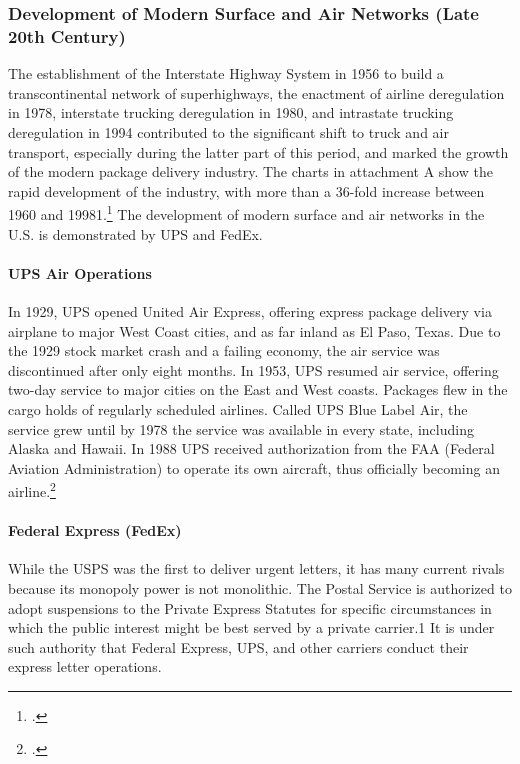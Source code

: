 \subsubsection{Development of Modern Surface and Air Networks (Late 20th Century)}
The establishment of the Interstate Highway System in 1956 to build a transcontinental network of superhighways, the enactment of airline deregulation in 1978, interstate trucking deregulation in 1980, and intrastate trucking deregulation in 1994 contributed to the significant shift to truck and air transport, especially during the latter part of this period, and marked the growth of the modern package delivery industry.  The charts in attachment A show the rapid development of the industry, with more than a 36-fold increase between 1960 and 19981.\footcite{PRC} The development of modern surface and air networks in the U.S. is demonstrated by UPS and FedEx.

\paragraph{UPS Air Operations} In 1929, UPS opened United Air Express, offering express package delivery via airplane to major West Coast cities, and as far inland as El Paso, Texas. Due to the 1929 stock market crash and a failing economy, the air service was discontinued after only eight months. In 1953, UPS resumed air service, offering two-day service to major cities on the East and West coasts. Packages flew in the cargo holds of regularly scheduled airlines. Called UPS Blue Label Air, the service grew until by 1978 the service was available in every state, including Alaska and Hawaii.  In 1988 UPS received authorization from the FAA (Federal Aviation Administration) to operate its own aircraft, thus officially becoming an airline.\footcite{uspsManual}

\paragraph{Federal Express (FedEx)} While the USPS was the first to deliver urgent letters, it has many current rivals because its monopoly power is not monolithic. The Postal Service is authorized to adopt suspensions to the Private Express Statutes for specific circumstances in which the public interest might be best served by a private carrier.1 It is under such authority that Federal Express, UPS, and other carriers conduct their express letter operations.

